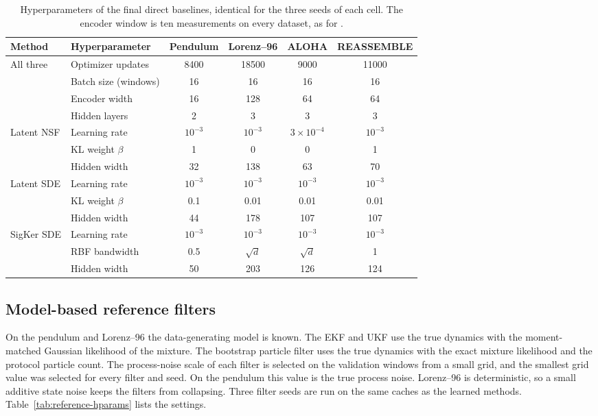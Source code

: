 \begin{table}[htbp]
\centering\footnotesize
\begin{tabular}{llcccc}
\toprule
Method & Hyperparameter & Pendulum & Lorenz--96 & ALOHA & REASSEMBLE \\
\midrule
All three & Optimizer updates & 8400 & 18500 & 9000 & 11000 \\
 & Batch size (windows) & 16 & 16 & 16 & 16 \\
 & Encoder width & 16 & 128 & 64 & 64 \\
 & Hidden layers & 2 & 3 & 3 & 3 \\
\midrule
Latent NSF & Learning rate & $10^{-3}$ & $10^{-3}$ & $3\times10^{-4}$ & $10^{-3}$ \\
 & KL weight $\beta$ & 1 & 0 & 0 & 1 \\
 & Hidden width & 32 & 138 & 63 & 70 \\
\midrule
Latent SDE & Learning rate & $10^{-3}$ & $10^{-3}$ & $10^{-3}$ & $10^{-3}$ \\
 & KL weight $\beta$ & 0.1 & 0.01 & 0.01 & 0.01 \\
 & Hidden width & 44 & 178 & 107 & 107 \\
\midrule
SigKer SDE & Learning rate & $10^{-3}$ & $10^{-3}$ & $10^{-3}$ & $10^{-3}$ \\
 & RBF bandwidth & 0.5 & $\sqrt d$ & $\sqrt d$ & 1 \\
 & Hidden width & 50 & 203 & 126 & 124 \\
\bottomrule
\end{tabular}
\caption{Hyperparameters of the final direct baselines, identical for the three seeds of each cell. The encoder window is ten measurements on every dataset, as for \method.}
\label{tab:baseline-hparams}
\end{table}

\subsection{Model-based reference filters}\label{app:references}
On the pendulum and Lorenz--96 the data-generating model is known. The EKF and UKF use the true dynamics with the moment-matched Gaussian likelihood of the mixture. The bootstrap particle filter uses the true dynamics with the exact mixture likelihood and the protocol particle count. The process-noise scale of each filter is selected on the validation windows from a small grid, and the smallest grid value was selected for every filter and seed. On the pendulum this value is the true process noise. Lorenz--96 is deterministic, so a small additive state noise keeps the filters from collapsing. Three filter seeds are run on the same caches as the learned methods. Table~\ref{tab:reference-hparams} lists the settings.

